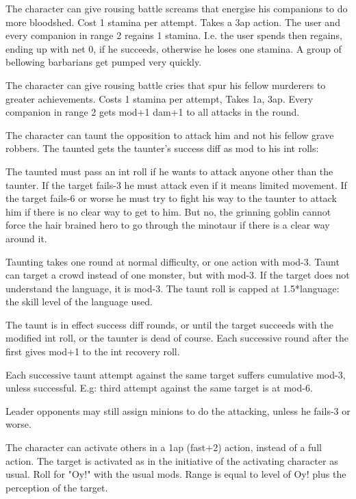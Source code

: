  The character can give rousing battle screams that energise his companions to do more bloodshed.
Cost 1 stamina per attempt. Takes a 3ap action. The user and every companion in range 2 regains 1 stamina. I.e. the user spends then regains, ending up with net 0, if he succeeds, otherwise he loses one stamina.
A group of bellowing barbarians get pumped very quickly.


 The character can give rousing battle cries that spur his fellow murderers to greater achievements.
Costs 1 stamina per attempt, Takes 1a, 3ap. Every companion in range 2 gets mod+1 dam+1 to all attacks in the round.


 The character can taunt the opposition to attack him and not his fellow grave robbers. The taunted gets the taunter's success diff as mod to his int rolls:

The taunted must pass an int roll if he wants to attack anyone other than the taunter. If the target fails-3 he must attack even if it means limited movement. If the target fails-6 or worse he must try to fight his way to the taunter to attack him if there is no clear way to get to him. But no, the grinning goblin cannot force the hair brained hero to go through the minotaur if there is a clear way around it.

Taunting takes one round at normal difficulty, or one action with mod-3. Taunt can target a crowd instead of one monster, but with mod-3. If the target does not understand the language, it is mod-3. The taunt roll is capped at 1.5*language: the skill level of the language used.

The taunt is in effect success diff rounds, or until the target succeeds with the modified int roll, or the taunter is dead of course. Each successive round after the first gives mod+1 to the int recovery roll.

Each successive taunt attempt against the same target suffers cumulative mod-3, unless successful. E.g: third attempt against the same target is at mod-6.

Leader opponents may still assign minions to do the attacking, unless he fails-3 or worse.


 The character can activate others in a 1ap (fast+2) action, instead of a full action. The target is activated as in the initiative of the activating character as usual.
Roll for "Oy!" with the usual mods. Range is equal to level of Oy! plus the perception of the target.

